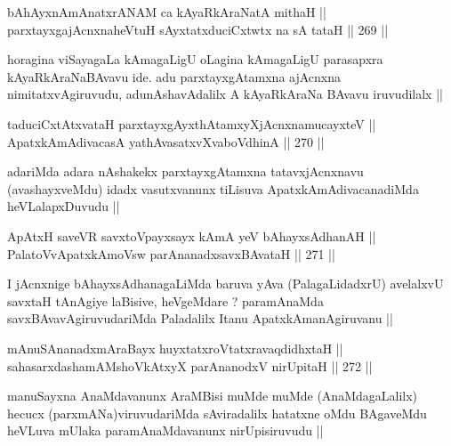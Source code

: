 \begin{shl}
bAhAyxnAmAnatxrANAM ca kAyaRkAraNatA mithaH || \\
parxtayxgajAcnxnaheVtuH sAyxtatxduciCxtwtx na sA tataH ||  269 ||  
\end{shl}

\begin{artha}
horagina viSayagaLa kAmagaLigU oLagina kAmagaLigU parasapxra
kAyaRkAraNaBAvavu ide. adu parxtayxgAtamxna ajAcnxna
nimitatxvAgiruvudu, adunAshavAdalilx A kAyaRkAraNa BAvavu iruvudilalx ||
\end{artha}


\begin{shl}
taduciCxtAtxvataH parxtayxgAyxthAtamxyXjAcnxnamucayxteV || \\
ApatxkAmAdivacasA yathAvasatxvXvaboVdhinA ||  270 ||  
\end{shl}

\begin{artha}
adariMda adara nAshakekx parxtayxgAtamxna tatavxjAcnxnavu
(avashayxveMdu) idadx vasutxvanunx tiLisuva ApatxkAmAdivacanadiMda
heVLalapxDuvudu ||
\end{artha}


\begin{shl}
ApAtxH saveVR savxtoV\s payxsayx kAmA yeV bAhayxsAdhanAH || \\
PalatoV\s vApatxkAmoV\s sw parAnanadxsavxBAvataH ||  271 ||  
\end{shl}

\begin{artha}
I jAcnxnige bAhayxsAdhanagaLiMda baruva yAva (PalagaLidadxrU)
avelalxvU savxtaH tAnAgiye laBisive, heVgeMdare  ? paramAnaMda
savxBAvavAgiruvudariMda Paladalilx Itanu ApatxkAmanAgiruvanu ||
\end{artha}


\begin{shl}
mAnuSAnanadxmAraBayx huyxtatxroVtatxravaqdidhxtaH || \\
sahasarxdashamAMshoVkAtxyX parAnanodxV nirUpitaH ||  272 ||  
\end{shl}

\begin{artha}
manuSayxna AnaMdavanunx AraMBisi muMde muMde (AnaMdagaLalilx) hecucx
(parxmANa)viruvudariMda sAviradalilx hatatxne oMdu BAgaveMdu heVLuva
mUlaka paramAnaMdavanunx nirUpisiruvudu ||
\end{artha}

